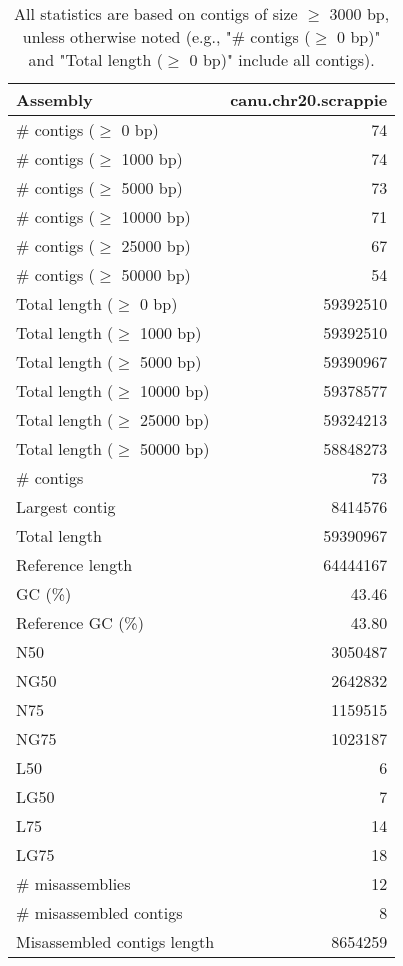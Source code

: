\documentclass[12pt,a4paper]{article}
\begin{document}
\begin{table}[ht]
\begin{center}
\caption{All statistics are based on contigs of size $\geq$ 3000 bp, unless otherwise noted (e.g., "\# contigs ($\geq$ 0 bp)" and "Total length ($\geq$ 0 bp)" include all contigs).}
\begin{tabular}{|l*{1}{|r}|}
\hline
Assembly & canu.chr20.scrappie \\ \hline
\# contigs ($\geq$ 0 bp) & 74 \\ \hline
\# contigs ($\geq$ 1000 bp) & 74 \\ \hline
\# contigs ($\geq$ 5000 bp) & 73 \\ \hline
\# contigs ($\geq$ 10000 bp) & 71 \\ \hline
\# contigs ($\geq$ 25000 bp) & 67 \\ \hline
\# contigs ($\geq$ 50000 bp) & 54 \\ \hline
Total length ($\geq$ 0 bp) & 59392510 \\ \hline
Total length ($\geq$ 1000 bp) & 59392510 \\ \hline
Total length ($\geq$ 5000 bp) & 59390967 \\ \hline
Total length ($\geq$ 10000 bp) & 59378577 \\ \hline
Total length ($\geq$ 25000 bp) & 59324213 \\ \hline
Total length ($\geq$ 50000 bp) & 58848273 \\ \hline
\# contigs & 73 \\ \hline
Largest contig & 8414576 \\ \hline
Total length & 59390967 \\ \hline
Reference length & 64444167 \\ \hline
GC (\%) & 43.46 \\ \hline
Reference GC (\%) & 43.80 \\ \hline
N50 & 3050487 \\ \hline
NG50 & 2642832 \\ \hline
N75 & 1159515 \\ \hline
NG75 & 1023187 \\ \hline
L50 & 6 \\ \hline
LG50 & 7 \\ \hline
L75 & 14 \\ \hline
LG75 & 18 \\ \hline
\# misassemblies & 12 \\ \hline
\# misassembled contigs & 8 \\ \hline
Misassembled contigs length & 8654259 \\ \hline

\end{tabular}
\end{center}
\end{table}
\end{document}
